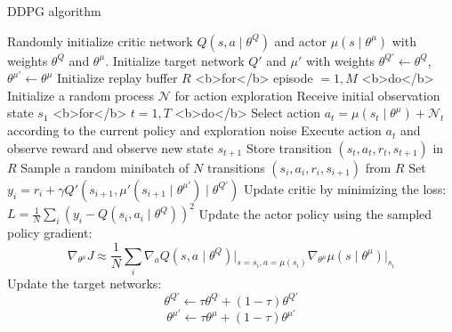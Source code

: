 DDPG algorithm

Randomly initialize critic network \( Q(s, a \mid \theta^Q) \) and actor \( \mu(s \mid \theta^\mu) \) with weights \( \theta^Q \) and \( \theta^\mu \).
Initialize target network \( Q' \) and \( \mu' \) with weights \( \theta^{Q'} \leftarrow \theta^Q \), \( \theta^{\mu'} \leftarrow \theta^\mu \)
Initialize replay buffer \( R \)
<b>for</b> episode \( = 1, M \) <b>do</b>
	Initialize a random process \( \mathcal{N} \) for action exploration
	Receive initial observation state \( s_1 \)
	<b>for</b> \( t = 1, T \) <b>do</b>
		Select action \( a_t = \mu(s_t \mid \theta^\mu) + \mathcal{N}_t \) according to the current policy and exploration noise
		Execute action \( a_t \) and observe reward and observe new state \( s_{t+1} \)
		Store transition \( (s_t, a_t, r_t, s_{t+1}) \) in \( R \)
		Sample a random minibatch of \( N \) transitions \( (s_i, a_i, r_i, s_{i+1}) \) from \( R \)
		Set \( y_i = r_i + \gamma Q'(s_{i+1}, \mu'(s_{i+1} \mid \theta^{\mu'}) \mid \theta^{Q'}) \)
		Update critic by minimizing the loss: \( L = \frac{1}{N}\sum_i(y_i - Q(s_i, a_i \mid \theta^Q))^2 \)
		Update the actor policy using the sampled policy gradient:
		\[ \nabla_{\theta^\mu}J \approx \frac{1}{N}\sum\limits_i{\nabla_a{Q(s, a \mid \theta^Q)\rvert_{s = s_i, a = \mu(s_i)}} \nabla_{\theta^\mu}{\mu(s \mid \theta^\mu)\rvert_{s_i}}} \]
		Update the target networks:
		\[ \theta^{Q'} \leftarrow \tau\theta^Q + (1 - \tau)\theta^{Q'} \]
		\[ \theta^{\mu'} \leftarrow \tau\theta^\mu + (1 - \tau)\theta^{\mu'} \]
